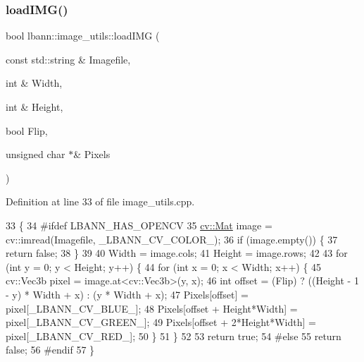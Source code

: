 \subsubsection{\texorpdfstring{load\+I\+M\+G()}{loadIMG()}\hspace{0.1cm}{\footnotesize\ttfamily [2/2]}}
{\footnotesize\ttfamily bool lbann\+::image\+\_\+utils\+::load\+I\+MG (\begin{DoxyParamCaption}\item[{const std\+::string \&}]{Imagefile,  }\item[{int \&}]{Width,  }\item[{int \&}]{Height,  }\item[{bool}]{Flip,  }\item[{unsigned char $\ast$\&}]{Pixels }\end{DoxyParamCaption})\hspace{0.3cm}{\ttfamily [static]}}



Definition at line 33 of file image\+\_\+utils.\+cpp.


\begin{DoxyCode}
33                                                                                                            
                \{
34 \textcolor{preprocessor}{#ifdef LBANN\_HAS\_OPENCV}
35   \hyperlink{base_8hpp_a68f11fdc31b62516cb310831bbe54d73}{cv::Mat} image = cv::imread(Imagefile, \_LBANN\_CV\_COLOR\_);
36   \textcolor{keywordflow}{if} (image.empty()) \{
37     \textcolor{keywordflow}{return} \textcolor{keyword}{false};
38   \}
39 
40   Width = image.cols;
41   Height = image.rows;
42 
43   \textcolor{keywordflow}{for} (\textcolor{keywordtype}{int} y = 0; y < Height; y++) \{
44     \textcolor{keywordflow}{for} (\textcolor{keywordtype}{int} x = 0; x < Width; x++) \{
45       cv::Vec3b pixel = image.at<cv::Vec3b>(y, x);
46       \textcolor{keywordtype}{int} offset = (Flip) ? ((Height - 1 - y) * Width + x) : (y * Width + x);
47       Pixels[offset]                  = pixel[\_LBANN\_CV\_BLUE\_];
48       Pixels[offset + Height*Width]   = pixel[\_LBANN\_CV\_GREEN\_];
49       Pixels[offset + 2*Height*Width] = pixel[\_LBANN\_CV\_RED\_];
50     \}
51   \}
52 
53   \textcolor{keywordflow}{return} \textcolor{keyword}{true};
54 \textcolor{preprocessor}{#else}
55   \textcolor{keywordflow}{return} \textcolor{keyword}{false};
56 \textcolor{preprocessor}{#endif}
57 \}
\end{DoxyCode}
\mbox{\label{classlbann_1_1image__utils_a203c94bf2f0d1180af1be27da33a0ad6}} 
